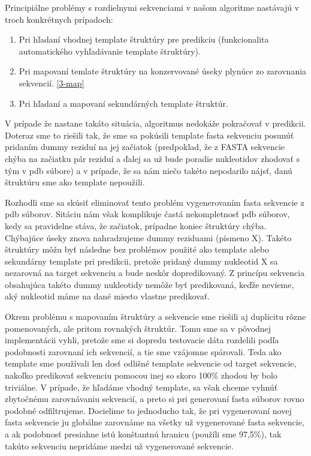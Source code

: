 \indent Principiálne problémy s rozdielnymi sekvenciami v našom algoritme nastávajú v troch konkrétnych prípadoch: 

\begin{enumerate}
\item Pri hľadaní vhodnej template štruktúry pre predikciu (funkcionalita automatického vyhľadávanie template štruktúry).
\item Pri mapovaní temlate štruktúry na konzervované úseky plynúce zo zarovnania sekvencií. \ref{3-map}
\item Pri hľadaní a mapovaní sekundárných template štruktúr. 
\end{enumerate}


\indent V prípade že nastane takáto situácia, algoritmus nedokáže pokračovať v predikcii. Doteraz sme to riešili tak, že sme sa pokúsili template fasta sekvenciu posunúť pridaním dummy reziduí na jej začiatok (predpoklad, že z FASTA sekvencie chýba na začiatku pár reziduí a ďalej sa už bude poradie nukleotidov zhodovať s tým v pdb súbore) a v prípade, že sa nám niečo takéto nepodarilo nájsť, danú štruktúru sme ako template nepoužili.


\indent Rozhodli sme sa skúsiť eliminovať tento problém vygenerovaním fasta sekvencie z pdb súborov. Sitáciu nám však komplikuje častá nekompletnosť pdb súborov, kedy sa pravidelne stáva, že začiatok, prípadne koniec štruktúry chýba. Chýbajúce úseky znova nahradzujeme dummy reziduami (písmeno X). Takéto štruktúry môžu byť následne bez problémov použité ako template alebo sekundárny template pri predikcii, pretože pridaný dummy nukleotid X sa nezarovná na target sekvenciu a bude neskôr dopredikovaný. Z princípu sekvencia obsahujúca takéto dummy nukleotidy nemôže byť predikovaná, keďže nevieme, aký nukleotid máme na dané miesto vlastne predikovať.


\indent Okrem problému s mapovaním štruktúry a sekvencie sme riešili aj duplicitu rôzne pomenovaných, ale pritom rovnakých štruktúr. Tomu sme sa v pôvodnej implementácii vyhli, pretože sme si dopredu testovacie dáta rozdelili podľa podobnosti zarovnaní ich sekvencií, a tie sme vzájomne spárovali. Teda ako template sme používali len dosť odlišné template sekvencie od target sekvencie, nakoľko predikovať sekvenciu pomocou inej so skoro 100\% zhodou by bolo triviálne. V prípade, že hľadáme vhodný template, sa však chceme vyhnúť zbytočnému zarovnávaniu sekvencií, a preto si pri generovaní fasta súborov rovno podobné odfiltrujeme. Docielime to jednoducho tak, že pri vygenerovaní novej fasta sekvencie ju globálne zarovnáme na všetky už vygenerované fasta sekvencie, a ak podobnosť presiahne istú konštantnú hranicu (použíli sme 97,5\%), tak takúto sekvenciu nepridáme medzi už vygenerované sekvencie.